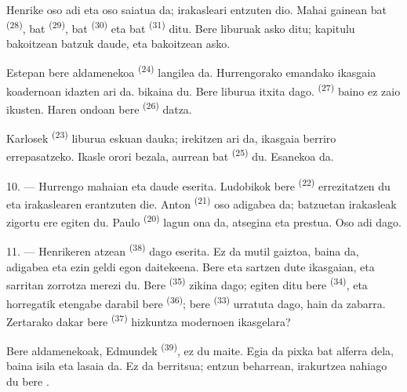 Henrike oso adi eta oso saiatua da; irakasleari entzuten dio. Mahai gainean
 bat \textsuperscript{(28)},  bat
\textsuperscript{(29)},  bat \textsuperscript{(30)} eta
 bat \textsuperscript{(31)} ditu. Bere liburuak
 asko ditu; kapitulu bakoitzean  batzuk daude,
eta  bakoitzean  asko.

Estepan bere aldamenekoa \textsuperscript{(24)} langilea da. Hurrengorako emandako
ikasgaia koadernoan idazten ari da.  bikaina du. Bere liburua
itxita dago.  \textsuperscript{(27)} baino ez zaio ikusten. Haren
ondoan bere  \textsuperscript{(26)} datza.

Karlosek \textsuperscript{(23)} liburua eskuan dauka; irekitzen ari da, ikasgaia
berriro errepasatzeko. Ikasle orori bezala, aurrean  bat
\textsuperscript{(25)} du. Esanekoa da.

10. --- Hurrengo mahaian  eta  daude
eserita. Ludobikok bere  \textsuperscript{(22)} errezitatzen du
eta irakaslearen  erantzuten die. Anton \textsuperscript{(21)}
oso adigabea da; batzuetan irakasleak zigortu ere egiten du. Paulo
\textsuperscript{(20)} lagun ona da, atsegina eta prestua. Oso adi dago.

\VUsaut{4.2mm}
\VUsaut{3.2mm}

11. --- Henrikeren atzean  \textsuperscript{(38)} dago eserita. Ez
da mutil gaiztoa, baina  da, adigabea eta ezin geldi egon
daitekeena. Bere  eta 
 sartzen dute ikasgaian, eta sarritan 
zorrotza merezi du. Bere  \textsuperscript{(35)} zikina dago;
 egiten ditu bere  \textsuperscript{(34)},
eta horregatik etengabe darabil bere  \textsuperscript{(36)}; bere
 \textsuperscript{(33)} urratuta dago, hain da zabarra. Zertarako
dakar bere  \textsuperscript{(37)} hizkuntza modernoen
ikasgelara?

Bere aldamenekoak, Edmundek \textsuperscript{(39)}, ez du maite. Egia da pixka bat
alferra dela, baina isila eta lasaia da. Ez da berritsua; entzun beharrean,
 irakurtzea nahiago du bere .

